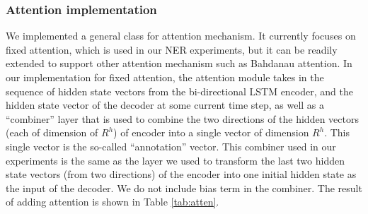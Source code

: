 \documentclass[11pt,a4paper]{article}
\begin{document}






\subsubsection{Attention implementation}

	We implemented a general class for attention mechanism. It currently focuses on fixed attention, which is used in our NER experiments, but it can be readily extended to support other attention mechanism such as Bahdanau attention. In our implementation for fixed attention, the attention module takes in the sequence of hidden state vectors from the bi-directional LSTM encoder, and the hidden state vector of the decoder at some current time step, as well as a ``combiner'' layer that is used to combine the two directions of the hidden vectors (each of dimension of $R^h$) of encoder into a single vector of dimension $R^h$. This single vector is the so-called ``annotation'' vector. This combiner used in our experiments is the same as the layer we used to transform the last two hidden state vectors (from two directions) of the encoder into one initial hidden state as the input of the decoder. We do not include bias term in the combiner. The result of adding attention is shown in Table \ref{tab:atten}.
\end{document}

